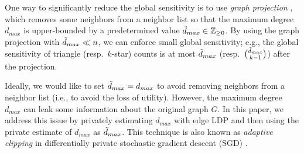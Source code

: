 One way to significantly reduce the global sensitivity is to use \textit{graph projection} \cite{Day_SIGMOD16,Kasiviswanathan_TCC13,Raskhodnikova_arXiv15}, which removes some neighbors from a neighbor list so that the maximum degree $d_{max}$ is upper-bounded by a predetermined value $\tilde{d}_{max} \in \mathbb{Z}_{\ge0}$. 
By using the graph projection with $\tilde{d}_{max} \ll n$, we can enforce small global sensitivity; e.g., the global sensitivity of triangle (resp.~$k$-star) counts is at most $\tilde{d}_{max}$ (resp.~$\binom{\tilde{d}_{max}}{k-1}$) after the projection. 

Ideally, we would like to set $\tilde{d}_{max} = d_{max}$ to avoid removing neighbors from a neighbor list (i.e., to avoid the loss of utility). 
However, the maximum degree $d_{max}$ can leak some information about the original graph $G$. 
In this paper, we address this issue by privately estimating $d_{max}$ with edge LDP and then using the private estimate of $d_{max}$ as $\tilde{d}_{max}$.
This technique 
is also known as 
\textit{adaptive clipping} 
in differentially private stochastic gradient descent (SGD) \cite{Pichapati_arXiv19,Thakkar_arXiv19}.





